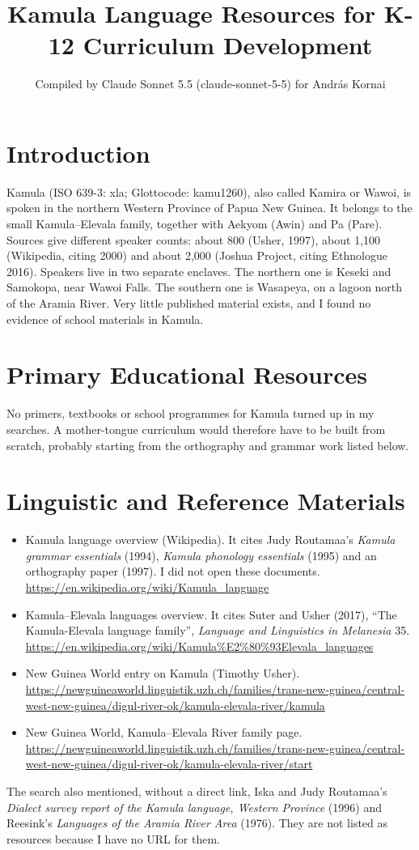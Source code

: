 \documentclass[12pt]{article}
\title{Kamula Language Resources for K-12 Curriculum Development}
\author{Compiled by Claude Sonnet 5.5 (claude-sonnet-5-5) for Andr\'as Kornai}
\date{}
\begin{document}
\maketitle

\section{Introduction}
Kamula (ISO 639-3: xla; Glottocode: kamu1260), also called Kamira or Wawoi, is spoken in the northern Western Province of Papua New Guinea. It belongs to the small Kamula--Elevala family, together with Aekyom (Awin) and Pa (Pare). Sources give different speaker counts: about 800 (Usher, 1997), about 1,100 (Wikipedia, citing 2000) and about 2,000 (Joshua Project, citing Ethnologue 2016). Speakers live in two separate enclaves. The northern one is Keseki and Samokopa, near Wawoi Falls. The southern one is Wasapeya, on a lagoon north of the Aramia River. Very little published material exists, and I found no evidence of school materials in Kamula.

\section{Primary Educational Resources}
No primers, textbooks or school programmes for Kamula turned up in my searches. A mother-tongue curriculum would therefore have to be built from scratch, probably starting from the orthography and grammar work listed below.

\section{Linguistic and Reference Materials}
\begin{itemize}
\item Kamula language overview (Wikipedia). It cites Judy Routamaa's \emph{Kamula grammar essentials} (1994), \emph{Kamula phonology essentials} (1995) and an orthography paper (1997). I did not open these documents. \url{https://en.wikipedia.org/wiki/Kamula_language}
\item Kamula--Elevala languages overview. It cites Suter and Usher (2017), ``The Kamula-Elevala language family'', \emph{Language and Linguistics in Melanesia} 35. \url{https://en.wikipedia.org/wiki/Kamula\%E2\%80\%93Elevala_languages}
\item New Guinea World entry on Kamula (Timothy Usher). \url{https://newguineaworld.linguistik.uzh.ch/families/trans-new-guinea/central-west-new-guinea/digul-river-ok/kamula-elevala-river/kamula}
\item New Guinea World, Kamula--Elevala River family page. \url{https://newguineaworld.linguistik.uzh.ch/families/trans-new-guinea/central-west-new-guinea/digul-river-ok/kamula-elevala-river/start}
\end{itemize}
The search also mentioned, without a direct link, Iska and Judy Routamaa's \emph{Dialect survey report of the Kamula language, Western Province} (1996) and Reesink's \emph{Languages of the Aramia River Area} (1976). They are not listed as resources because I have no URL for them.
\end{document}
